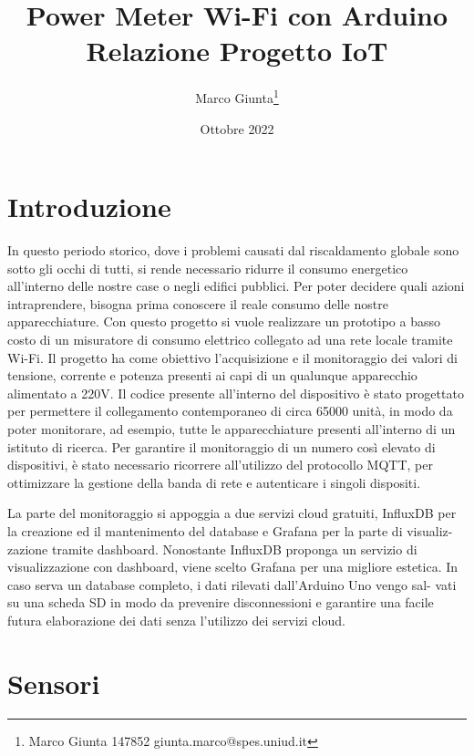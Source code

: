 \documentclass[italian,12pt,a4paper,oneside,final]{report}
\title{\huge Power Meter Wi-Fi con Arduino\\[0.5em]
\large Relazione Progetto IoT}
\date{Ottobre 2022}
\author{
Marco Giunta\thanks{Marco Giunta 147852 giunta.marco@spes.uniud.it}}
\begin{document}
\maketitle

\tableofcontents

\newpage

\section{Introduzione}
In questo periodo storico, dove i problemi causati dal riscaldamento globale sono sotto gli occhi di tutti, si rende necessario ridurre il consumo energetico all'interno delle nostre case o negli edifici pubblici.
Per poter decidere quali azioni intraprendere, bisogna prima conoscere il reale consumo delle nostre apparecchiature.
Con questo progetto si vuole realizzare un prototipo a basso costo di un misuratore di consumo elettrico collegato ad una rete locale tramite Wi-Fi.
Il progetto ha come obiettivo l’acquisizione e il monitoraggio dei valori di tensione, corrente e potenza presenti ai capi di un qualunque apparecchio alimentato a 220V.
Il codice presente all'interno del dispositivo è stato progettato per permettere il collegamento contemporaneo di circa 65000 unità, in modo da poter monitorare, ad esempio, tutte le apparecchiature presenti all'interno di un istituto di ricerca.
Per garantire il monitoraggio di un numero così elevato di dispositivi, è stato necessario ricorrere all'utilizzo del protocollo MQTT, per ottimizzare la gestione della banda di rete e autenticare i singoli dispositi.



La parte del monitoraggio si appoggia a due servizi cloud gratuiti, InfluxDB per
la creazione ed il mantenimento del database e Grafana per la parte di visualiz-
zazione tramite dashboard.
Nonostante InfluxDB proponga un servizio di visualizzazione con dashboard,
viene scelto Grafana per una migliore estetica.
In caso serva un database completo, i dati rilevati dall’Arduino Uno vengo sal-
vati su una scheda SD in modo da prevenire disconnessioni e garantire una facile
futura elaborazione dei dati senza l’utilizzo dei servizi cloud.

\section{Sensori}
\end{document}
